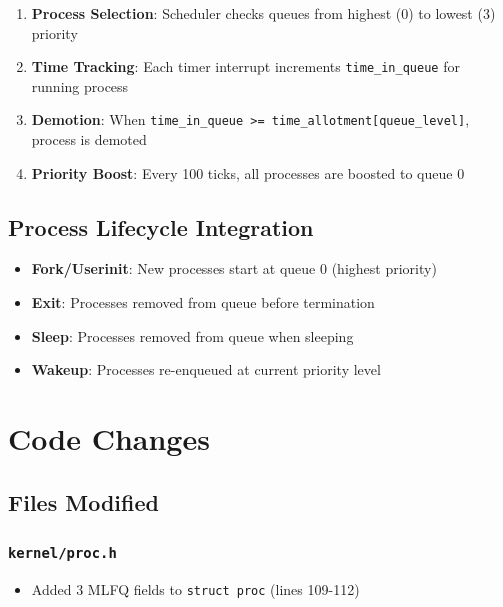 \documentclass[11pt,a4paper]{article}
\begin{document}
\begin{enumerate}
    \item \textbf{Process Selection}: Scheduler checks queues from highest (0) to lowest (3) priority
    \item \textbf{Time Tracking}: Each timer interrupt increments \texttt{time\_in\_queue} for running process
    \item \textbf{Demotion}: When \texttt{time\_in\_queue >= time\_allotment[queue\_level]}, process is demoted
    \item \textbf{Priority Boost}: Every 100 ticks, all processes are boosted to queue 0
\end{enumerate}

\subsection{Process Lifecycle Integration}

\begin{itemize}
    \item \textbf{Fork/Userinit}: New processes start at queue 0 (highest priority)
    \item \textbf{Exit}: Processes removed from queue before termination
    \item \textbf{Sleep}: Processes removed from queue when sleeping
    \item \textbf{Wakeup}: Processes re-enqueued at current priority level
\end{itemize}

\section{Code Changes}

\subsection{Files Modified}

\subsubsection{\texttt{kernel/proc.h}}
\begin{itemize}
    \item Added 3 MLFQ fields to \texttt{struct proc} (lines 109-112)
\end{itemize}
\end{document}
